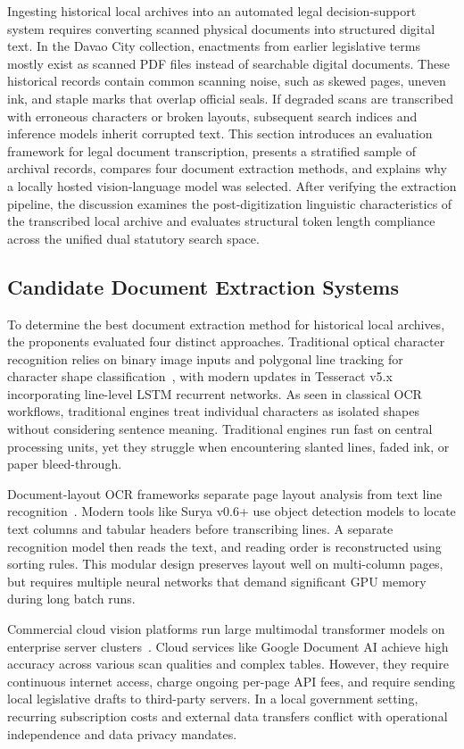 Ingesting historical local archives into an automated legal decision-support system requires converting scanned physical documents into structured digital text. In the Davao City collection, enactments from earlier legislative terms mostly exist as scanned PDF files instead of searchable digital documents. These historical records contain common scanning noise, such as skewed pages, uneven ink, and staple marks that overlap official seals. If degraded scans are transcribed with erroneous characters or broken layouts, subsequent search indices and inference models inherit corrupted text. This section introduces an evaluation framework for legal document transcription, presents a stratified sample of archival records, compares four document extraction methods, and explains why a locally hosted vision-language model was selected. After verifying the extraction pipeline, the discussion examines the post-digitization linguistic characteristics of the transcribed local archive and evaluates structural token length compliance across the unified dual statutory search space.


\subsection{Candidate Document Extraction Systems}
To determine the best document extraction method for historical local archives, the proponents evaluated four distinct approaches. Traditional optical character recognition relies on binary image inputs and polygonal line tracking for character shape classification~\cite{smith2007overview}, with modern updates in Tesseract v5.x incorporating line-level LSTM recurrent networks. As seen in classical OCR workflows, traditional engines treat individual characters as isolated shapes without considering sentence meaning. Traditional engines run fast on central processing units, yet they struggle when encountering slanted lines, faded ink, or paper bleed-through.

Document-layout OCR frameworks separate page layout analysis from text line recognition~\cite{paruchuri2024surya}. Modern tools like Surya v0.6+ use object detection models to locate text columns and tabular headers before transcribing lines. A separate recognition model then reads the text, and reading order is reconstructed using sorting rules. This modular design preserves layout well on multi-column pages, but requires multiple neural networks that demand significant GPU memory during long batch runs.

Commercial cloud vision platforms run large multimodal transformer models on enterprise server clusters~\cite{google2024documentai}. Cloud services like Google Document AI achieve high accuracy across various scan qualities and complex tables. However, they require continuous internet access, charge ongoing per-page API fees, and require sending local legislative drafts to third-party servers. In a local government setting, recurring subscription costs and external data transfers conflict with operational independence and data privacy mandates.

